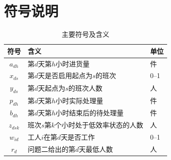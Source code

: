 \section{符号说明}

\begin{table}[htbp]
\centering
\caption{主要符号及含义}
\label{tab:symbols}
\begin{tabular}{cll}
\toprule
符号 & 含义 & 单位\\
\midrule
$a_{dh}$ & 第$d$天第$h$小时进货量 & 件\\
$x_{ds}$ & 第$d$天是否启用起点为$s$的班次 & 0--1\\
$y_{ds}$ & 第$d$天起点为$s$的班次人数 & 人\\
$p_{dh}$ & 第$d$天第$h$小时实际处理量 & 件\\
$b_{dh}$ & 第$d$天第$h$小时结束后的待处理量 & 件\\
$z_{dsk}$ & 班次$s$第$k$个小时处于低效率状态的人数 & 人\\
$w_{id}$ & 工人$i$在第$d$天是否工作 & 0--1\\
$r_d$ & 问题二给出的第$d$天最低人数 & 人\\
\bottomrule
\end{tabular}
\end{table}

